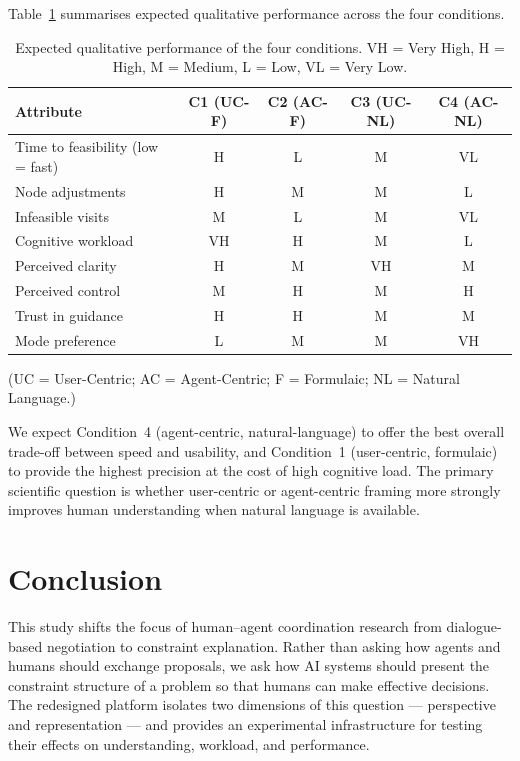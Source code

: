 \documentclass[10pt]{article}
\theoremstyle{definition}
\begin{document}
Table~\ref{tab:expected} summarises expected qualitative performance across the four conditions.

\begin{table}[t]
\centering
\caption{Expected qualitative performance of the four conditions.
VH = Very High, H = High, M = Medium, L = Low, VL = Very Low.}
\label{tab:expected}
\begin{tabular}{lcccc}
\toprule
\textbf{Attribute} & \textbf{C1 (UC-F)} & \textbf{C2 (AC-F)} & \textbf{C3 (UC-NL)}
                   & \textbf{C4 (AC-NL)} \\
\midrule
Time to feasibility (low = fast) & H   & L   & M   & VL  \\
Node adjustments                 & H   & M   & M   & L   \\
Infeasible visits                & M   & L   & M   & VL  \\
Cognitive workload               & VH  & H   & M   & L   \\
Perceived clarity                & H   & M   & VH  & M   \\
Perceived control                & M   & H   & M   & H   \\
Trust in guidance                & H   & H   & M   & M   \\
Mode preference                  & L   & M   & M   & VH  \\
\bottomrule
\end{tabular}
\end{table}

\noindent (UC = User-Centric; AC = Agent-Centric; F = Formulaic; NL = Natural Language.)

We expect Condition~4 (agent-centric, natural-language) to offer the best overall trade-off
between speed and usability, and Condition~1 (user-centric, formulaic) to provide the highest
precision at the cost of high cognitive load.  The primary scientific question is whether
user-centric or agent-centric framing more strongly improves human understanding when natural
language is available.

\section{Conclusion}
\label{sec:conclusion}

This study shifts the focus of human--agent coordination research from dialogue-based negotiation
to constraint explanation.  Rather than asking how agents and humans should exchange proposals, we
ask how AI systems should present the constraint structure of a problem so that humans can make
effective decisions.  The redesigned platform isolates two dimensions of this question ---
perspective and representation --- and provides an experimental infrastructure for testing their
effects on understanding, workload, and performance.
\end{document}
